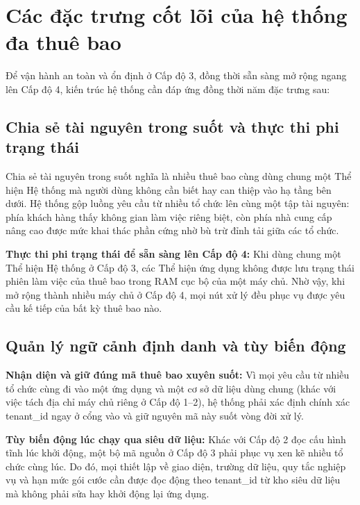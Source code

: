 \section{Các đặc trưng cốt lõi của hệ thống đa thuê bao}\label{v4-sec-1-4}

Để vận hành an toàn và ổn định ở Cấp độ 3, đồng thời sẵn sàng mở rộng ngang lên Cấp độ 4, kiến trúc hệ thống cần đáp ứng đồng thời năm đặc trưng sau:

\subsection{Chia sẻ tài nguyên trong suốt và thực thi phi trạng thái}\label{v4-sec-1-4-1}

Chia sẻ tài nguyên trong suốt nghĩa là nhiều thuê bao cùng dùng chung một Thể hiện Hệ thống mà người dùng không cần biết hay can thiệp vào hạ tầng bên dưới. Hệ thống gộp luồng yêu cầu từ nhiều tổ chức lên cùng một tập tài nguyên: phía khách hàng thấy không gian làm việc riêng biệt, còn phía nhà cung cấp nâng cao được mức khai thác phần cứng nhờ bù trừ đỉnh tải giữa các tổ chức.

\textbf{Thực thi phi trạng thái để sẵn sàng lên Cấp độ 4:} Khi dùng chung một Thể hiện Hệ thống ở Cấp độ 3, các Thể hiện ứng dụng không được lưu trạng thái phiên làm việc của thuê bao trong RAM cục bộ của một máy chủ. Nhờ vậy, khi mở rộng thành nhiều máy chủ ở Cấp độ 4, mọi nút xử lý đều phục vụ được yêu cầu kế tiếp của bất kỳ thuê bao nào.

\subsection{Quản lý ngữ cảnh định danh và tùy biến động}\label{v4-sec-1-4-2}

\textbf{Nhận diện và giữ đúng mã thuê bao xuyên suốt:} Vì mọi yêu cầu từ nhiều tổ chức cùng đi vào một ứng dụng và một cơ sở dữ liệu dùng chung (khác với việc tách địa chỉ máy chủ riêng ở Cấp độ 1--2), hệ thống phải xác định chính xác tenant\_\allowbreak{}id ngay ở cổng vào và giữ nguyên mã này suốt vòng đời xử lý.

\textbf{Tùy biến động lúc chạy qua siêu dữ liệu:} Khác với Cấp độ 2 đọc cấu hình tĩnh lúc khởi động, một bộ mã nguồn ở Cấp độ 3 phải phục vụ xen kẽ nhiều tổ chức cùng lúc. Do đó, mọi thiết lập về giao diện, trường dữ liệu, quy tắc nghiệp vụ và hạn mức gói cước cần được đọc động theo tenant\_\allowbreak{}id từ kho siêu dữ liệu mà không phải sửa hay khởi động lại ứng dụng.

